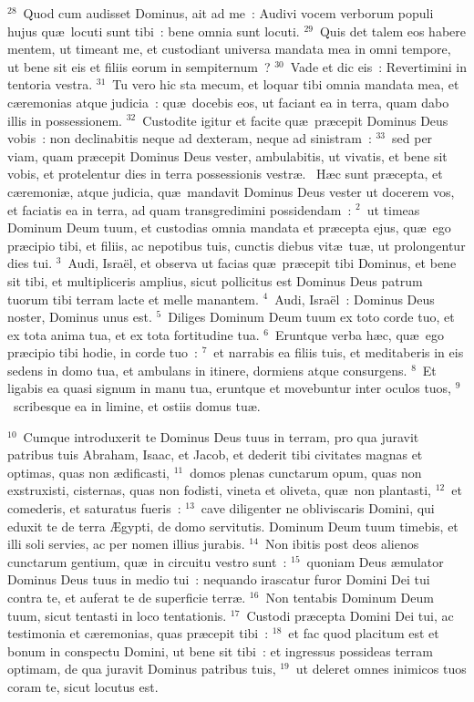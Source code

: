 ${}^{28}$~Quod cum audisset Dominus, ait ad me~: Audivi vocem verborum populi hujus qu\ae\ locuti sunt tibi~: bene omnia sunt locuti.
${}^{29}$~Quis det talem eos habere mentem, ut timeant me, et custodiant universa mandata mea in omni tempore, ut bene sit eis et filiis eorum in sempiternum~?
${}^{30}$~Vade et dic eis~: Revertimini in tentoria vestra.
${}^{31}$~Tu vero hic sta mecum, et loquar tibi omnia mandata mea, et c\ae remonias atque judicia~: qu\ae\ docebis eos, ut faciant ea in terra, quam dabo illis in possessionem.
${}^{32}$~Custodite igitur et facite qu\ae\ pr\ae cepit Dominus Deus vobis~: non declinabitis neque ad dexteram, neque ad sinistram~:
${}^{33}$~sed per viam, quam pr\ae cepit Dominus Deus vester, ambulabitis, ut vivatis, et bene sit vobis, et protelentur dies in terra possessionis vestr\ae .
~H\ae c sunt pr\ae cepta, et c\ae remoni\ae , atque judicia, qu\ae\ mandavit Dominus Deus vester ut docerem vos, et faciatis ea in terra, ad quam transgredimini possidendam~:
${}^{2}$~ut timeas Dominum Deum tuum, et custodias omnia mandata et pr\ae cepta ejus, qu\ae\ ego pr\ae cipio tibi, et filiis, ac nepotibus tuis, cunctis diebus vit\ae\ tu\ae , ut prolongentur dies tui.
${}^{3}$~Audi, Isra\"el, et observa ut facias qu\ae\ pr\ae cepit tibi Dominus, et bene sit tibi, et multipliceris amplius, sicut pollicitus est Dominus Deus patrum tuorum tibi terram lacte et melle manantem.
${}^{4}$~Audi, Isra\"el~: Dominus Deus noster, Dominus unus est.
${}^{5}$~Diliges Dominum Deum tuum ex toto corde tuo, et ex tota anima tua, et ex tota fortitudine tua.
${}^{6}$~Eruntque verba h\ae c, qu\ae\ ego pr\ae cipio tibi hodie, in corde tuo~:
${}^{7}$~et narrabis ea filiis tuis, et meditaberis in eis sedens in domo tua, et ambulans in itinere, dormiens atque consurgens.
${}^{8}$~Et ligabis ea quasi signum in manu tua, eruntque et movebuntur inter oculos tuos,
${}^{9}$~scribesque ea in limine, et ostiis domus tu\ae .


${}^{10}$~Cumque introduxerit te Dominus Deus tuus in terram, pro qua juravit patribus tuis Abraham, Isaac, et Jacob, et dederit tibi civitates magnas et optimas, quas non \ae dificasti,
${}^{11}$~domos plenas cunctarum opum, quas non exstruxisti, cisternas, quas non fodisti, vineta et oliveta, qu\ae\ non plantasti,
${}^{12}$~et comederis, et saturatus fueris~:
${}^{13}$~cave diligenter ne obliviscaris Domini, qui eduxit te de terra \AE gypti, de domo servitutis. Dominum Deum tuum timebis, et illi soli servies, ac per nomen illius jurabis.
${}^{14}$~Non ibitis post deos alienos cunctarum gentium, qu\ae\ in circuitu vestro sunt~:
${}^{15}$~quoniam Deus \ae mulator Dominus Deus tuus in medio tui~: nequando irascatur furor Domini Dei tui contra te, et auferat te de superficie terr\ae .
${}^{16}$~Non tentabis Dominum Deum tuum, sicut tentasti in loco tentationis.
${}^{17}$~Custodi pr\ae cepta Domini Dei tui, ac testimonia et c\ae remonias, quas pr\ae cepit tibi~:
${}^{18}$~et fac quod placitum est et bonum in conspectu Domini, ut bene sit tibi~: et ingressus possideas terram optimam, de qua juravit Dominus patribus tuis,
${}^{19}$~ut deleret omnes inimicos tuos coram te, sicut locutus est.


